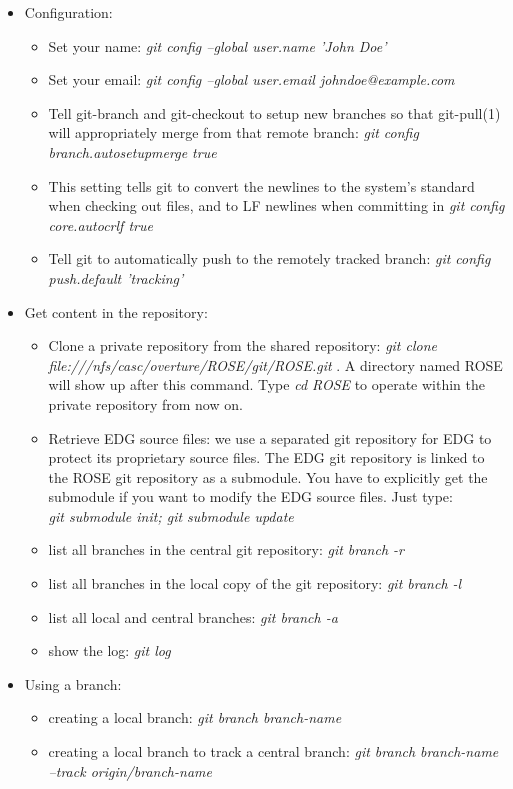 \begin{itemize}

\item Configuration:
  \begin{itemize}
          \item Set your name: \textit{git config --global user.name 'John Doe' }
	  \item Set your email: \textit{git config --global user.email johndoe@example.com}
	  \item Tell git-branch and git-checkout to setup new branches so that git-pull(1)
    will appropriately merge from that remote branch: \textit{git config branch.autosetupmerge true}
          \item This setting tells git to convert the newlines to the system’s standard
	    when checking out files, and to LF newlines when committing in \textit{git config core.autocrlf true}
	 \item Tell git to automatically push to the remotely tracked branch: 
	 	\textit{git config push.default 'tracking'}
   \end{itemize}       
\item Get content in the repository:
  \begin{itemize}
          \item Clone a private repository from the shared repository: \textit{git clone 
          file:///nfs/casc/overture/ROSE/git/ROSE.git} . A directory named ROSE will show up after this 
           command. Type \textit{cd ROSE} to operate within the private repository from now on.
           \item Retrieve EDG source files: we use a separated git
           repository for EDG to protect its proprietary source files. The
           EDG git repository is linked to the ROSE git repository as a
           submodule. You have to explicitly get the submodule if you want to
           modify the EDG source files. Just type:
           \\ \textit{git submodule init; git submodule update}
          \item list all branches in the central git repository: \textit{git branch -r}
          \item list all branches in the local copy of the git repository: \textit{git branch -l}
          \item list all local and central branches: \textit{git branch -a}

          \item show the log: \textit{git log} 
   \end{itemize}       
\item Using a branch:
   \begin{itemize}
          \item creating a local branch: \textit{git branch branch-name} 
          \item creating a local branch to track a central branch: \textit{git branch branch-name --track origin/branch-name} 


\end{itemize}
\end{itemize}
